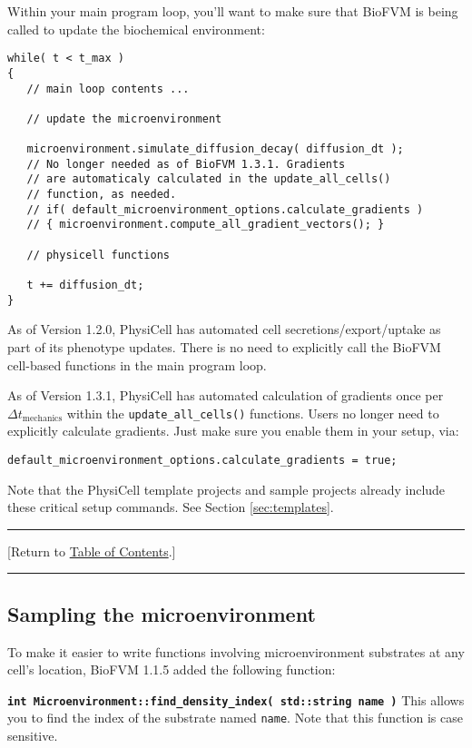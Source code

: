 \documentclass[12pt]{article}
\renewcommand{\v}{\verb}
\newcommand{\smallcode}[1]{\textbf{\texttt{#1}}}
\newcommand{\TOClink}{\begin{center}\hrule\vskip-5pt\phantom{.}\hfill[Return to \hyperlink{TOC}{Table of Contents}.]\hfill\phantom{.}\vskip3pt\hrule\end{center}}
\begin{document}
Within your main program loop, you'll want to make sure that BioFVM is being called to 
update the biochemical environment: 

\begin{verbatim}
while( t < t_max )
{
   // main loop contents ... 

   // update the microenvironment
  
   microenvironment.simulate_diffusion_decay( diffusion_dt );
   // No longer needed as of BioFVM 1.3.1. Gradients 
   // are automaticaly calculated in the update_all_cells() 
   // function, as needed. 
   // if( default_microenvironment_options.calculate_gradients )
   // { microenvironment.compute_all_gradient_vectors(); }   
   
   // physicell functions 
  
   t += diffusion_dt; 
}
\end{verbatim}

As of Version 1.2.0, PhysiCell has automated cell secretions/export/uptake as part of its phenotype 
updates. There is no need to explicitly call the BioFVM cell-based functions in the main program loop.

As of Version 1.3.1, PhysiCell has automated calculation of gradients once per $\Delta t_\textrm{mechanics}$ 
within the \texttt{update\_all\_cells()} functions. Users no longer need to explicitly calculate gradients. 
Just make sure you enable them in your setup, via: 

\begin{verbatim}
default_microenvironment_options.calculate_gradients = true; 
\end{verbatim}

Note that the PhysiCell template projects and sample projects already include these critical setup commands. 
See Section \ref{sec:templates}. 

\TOClink 

\subsection{Sampling the microenvironment}
\label{sec:sample_microenvironment}
To make it easier to write functions involving microenvironment substrates 
at any cell's location, BioFVM 1.1.5 added the following function: 

\smallcode{int Microenvironment::find\_density\_index( std::string name )}
This allows you to find the index of the substrate named \v|name|. Note that this 
function is case sensitive. 
\end{document}
